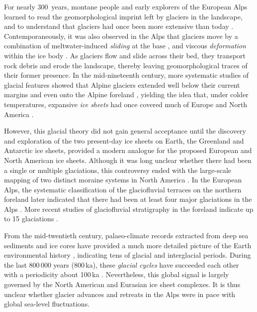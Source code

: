 \documentclass[tc, manuscript]{copernicus}
\begin{document}
    For nearly 300~years, montane people and early explorers of the European
    Alps learned to read the geomorphological imprint left by glaciers in the
    landscape, and to understand that glaciers had once been more extensive
    than today \citep[e.g.,][p.~21]{Windham.Martel.1744}. Contemporaneously,
    it was also observed in the Alps that glaciers move by a combination of
    meltwater-induced \emph{sliding} at the base \citep[\S532]{Saussure.1779},
    and viscous \emph{deformation} within the ice body \citep{Forbes.1846b}. As
    glaciers flow and slide across their bed, they transport rock debris and
    erode the landscape, thereby leaving geomorphological traces of their
    former presence. In the mid-nineteenth
    century, more systematic studies of glacial features showed that Alpine
    glaciers extended well below their current margins \citep{Venetz.1821}
    and even onto the Alpine foreland \citep{Charpentier.1841}, yielding the
    idea that, under colder temperatures, expansive \emph{ice sheets} had once
    covered much of Europe and North America \citep{Agassiz.1840}.

    However, this glacial theory did not gain general acceptance until the
    discovery and exploration of the two present-day ice sheets on Earth, the
    Greenland and Antarctic ice sheets, provided a modern analogue for the
    proposed European and North American ice sheets. Although it was long
    unclear whether there had been a single or multiple glaciations,
    this controversy ended with the large-scale mapping of two distinct moraine
    systems in North America \citep{Chamberlin.1894}. In the European Alps, the
    systematic classification of the glaciofluvial terraces on the northern
    foreland later indicated that there had been at least four major
    glaciations in the Alps \citep{Penck.Bruckner.1909}. More recent studies
    of glaciofluvial stratigraphy in the foreland indicate up to 15 glaciations
    \citep{Schluchter.1988, Ivy-Ochs.etal.2008, Preusser.etal.2011}.

    From the mid-twentieth
    century, palaeo-climate records extracted from deep sea sediments and
    ice cores have provided a much more detailed picture of the Earth
    environmental history \citep[e.g.,][]{Emiliani.1955,
    Shackleton.Opdyke.1973, Dansgaard.etal.1993, Augustin.etal.2004},
    indicating tens of glacial and
    interglacial periods. During the last 800\,000 years (800\,ka), these
    \emph{glacial cycles}
    have succeeded each other with a periodicity about 100\,ka \citep{Hays.etal.1976,
    Augustin.etal.2004}. Nevertheless, this global signal is largely governed
    by the North American and Eurasian ice sheet complexes. It is thus unclear
    whether glacier advances and retreats in the Alps were in pace with global
    sea-level fluctuations.
\end{document}

